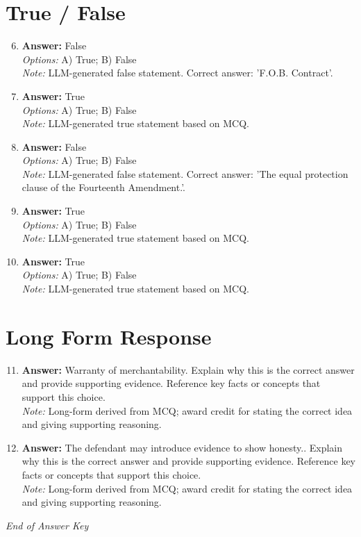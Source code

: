 \documentclass[12pt]{article}
\begin{document}
\section*{True / False}
\begin{enumerate}[label=\arabic*.]
\setcounter{enumi}{5}
\item \textbf{Answer:} False
\\ \textit{Options:} A) True; B) False
\\ \textit{Note:} LLM-generated false statement. Correct answer: 'F.O.B. Contract'.
\item \textbf{Answer:} True
\\ \textit{Options:} A) True; B) False
\\ \textit{Note:} LLM-generated true statement based on MCQ.
\item \textbf{Answer:} False
\\ \textit{Options:} A) True; B) False
\\ \textit{Note:} LLM-generated false statement. Correct answer: 'The equal protection clause of the Fourteenth Amendment.'.
\item \textbf{Answer:} True
\\ \textit{Options:} A) True; B) False
\\ \textit{Note:} LLM-generated true statement based on MCQ.
\item \textbf{Answer:} True
\\ \textit{Options:} A) True; B) False
\\ \textit{Note:} LLM-generated true statement based on MCQ.
\end{enumerate}

\section*{Long Form Response}
\begin{enumerate}[label=\arabic*.]
\setcounter{enumi}{10}
\item \textbf{Answer:} Warranty of merchantability. Explain why this is the correct answer and provide supporting evidence. Reference key facts or concepts that support this choice.
\\ \textit{Note:} Long-form derived from MCQ; award credit for stating the correct idea and giving supporting reasoning.
\item \textbf{Answer:} The defendant may introduce evidence to show honesty.. Explain why this is the correct answer and provide supporting evidence. Reference key facts or concepts that support this choice.
\\ \textit{Note:} Long-form derived from MCQ; award credit for stating the correct idea and giving supporting reasoning.
\end{enumerate}

\vfill
\noindent\textit{End of Answer Key}
\end{document}

